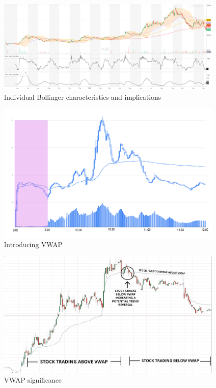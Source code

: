 \documentclass{article}
\begin{document}
\begin{figure}[!htb]
    \centering
    \includegraphics[width=\textwidth]{imgs/89.png}
    \caption{Individual Bollinger characteristics and implications}
\end{figure}

\vspace{10pt}

\begin{figure}[!htb]
    \centering
    \includegraphics[width=\textwidth]{imgs/90.png}
    \caption{Introducing VWAP}
\end{figure}

\vspace{10pt}

\begin{figure}[!htb]
    \centering
    \includegraphics[width=\textwidth]{imgs/91.png}
    \caption{VWAP significance}
\end{figure}
\end{document}
